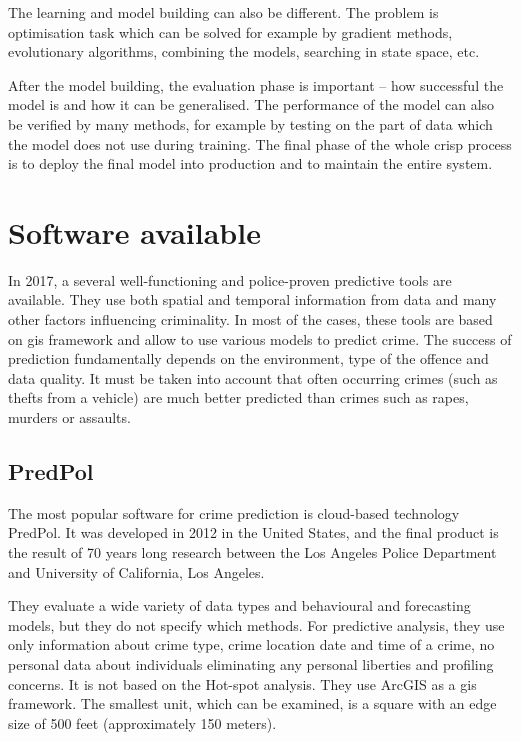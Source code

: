 \documentclass[thesis=M,english]{FITthesis}[2012/10/20]
\begin{document}
The learning and model building can also be different. The problem is optimisation task which can be solved for example by gradient methods, evolutionary algorithms, combining the models, searching in state space, etc. 

After the model building, the evaluation phase is important -- how successful the model is and how it can be generalised. The performance of the model can also be verified by many methods, for example by testing on the part of data which the model does not use during training. The final phase of the whole \gls{crisp} process is to deploy the final model into production and to maintain the entire system.

\section{Software available}\label{software}

In 2017, a several well-functioning and police-proven predictive tools are available. They use both spatial and temporal information from data and many other factors influencing criminality. In most of the cases, these tools are based on \gls{gis} framework and allow to use various models to predict crime. The success of prediction fundamentally depends on the environment, type of the offence and data quality. It must be taken into account that often occurring crimes (such as thefts from a vehicle) are much better predicted than crimes such as rapes, murders or assaults.  

\subsection{PredPol}

The most popular software for crime prediction is cloud-based technology PredPol.\cite{predpol} It was developed in 2012 in the United States, and the final product is the result of 70 years long research between the Los Angeles Police Department and University of California, Los Angeles. 

They evaluate a wide variety of data types and behavioural and forecasting models, but they do not specify which methods. For predictive analysis, they use only information about crime type, crime location date and time of a crime, no personal data about individuals eliminating any personal liberties and profiling concerns. It is not based on the Hot-spot analysis. They use ArcGIS as a \gls{gis} framework. The smallest unit, which can be examined, is a square with an edge size of 500 feet (approximately 150 meters). 
 
\end{document}
